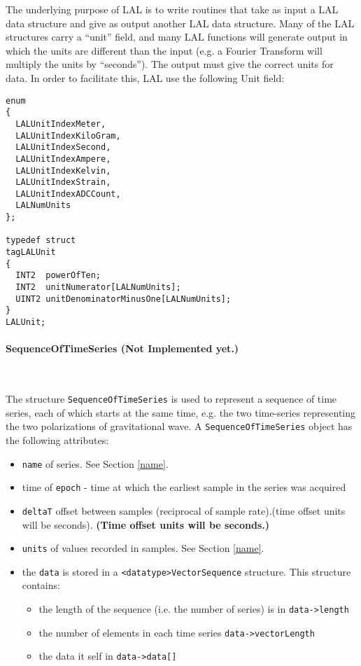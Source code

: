 \documentclass[]{ligodcc}
\renewcommand{\texttt}[1]{{\ttfamily\color{blue}#1}}
\begin{document}
The underlying purpose of LAL is to write routines that take as input
a LAL data structure and give as output another LAL data structure.
Many of the LAL structures carry a ``unit'' field, and many LAL
functions will generate output in which the  units are different than
the input (e.g. a Fourier Transform will multiply the units by
``seconds'').  The output must give the correct units for data.  In
order to facilitate this, LAL use the following Unit field:

{\footnotesize
\begin{verbatim}
enum
{
  LALUnitIndexMeter,
  LALUnitIndexKiloGram,
  LALUnitIndexSecond,
  LALUnitIndexAmpere,
  LALUnitIndexKelvin,
  LALUnitIndexStrain,
  LALUnitIndexADCCount,
  LALNumUnits
};

typedef struct
tagLALUnit
{
  INT2  powerOfTen;
  INT2  unitNumerator[LALNumUnits];
  UINT2 unitDenominatorMinusOne[LALNumUnits];
}
LALUnit;
\end{verbatim}}


\paragraph{{\texttt {SequenceOfTimeSeries}}  {\bf (Not Implemented yet.)} }~

The structure {\tt SequenceOfTimeSeries} is used to represent a sequence of
time series, each of which starts at the same time, e.g. the two
time-series representing the two polarizations of gravitational
wave. A  {\tt SequenceOfTimeSeries} object has the following attributes:

\begin{itemize}
\vspace{-0.15in}
\item
{\tt name} of series.  See Section \ref{name}.
\vspace{-0.15in}
\item
time of {\tt epoch} - time at which the earliest sample in the series was acquired
\vspace{-0.15in}
\item
{\tt deltaT} offset between samples (reciprocal of sample
rate).(time offset units will be seconds).  {\bf (Time offset units will
be seconds.)}
\vspace{-0.15in}
\item
{\tt units} of values recorded in samples. See Section \ref{name}.
\vspace{-0.15in}
\item
the {\tt data} is stored in a {\tt <datatype>VectorSequence}  structure.
This structure contains:
\begin{itemize}
\vspace{-0.10in}
\item
the length of the sequence (i.e. the number of series) is  in
{\tt data->length}
\vspace{-0.10in}
\item
the number of elements in each time series {\tt data->vectorLength}
\vspace{-0.10in}
\item
the data it self in {\tt data->data[]}
\end{itemize}
\end{itemize}
\end{document}
